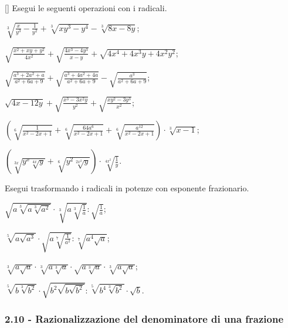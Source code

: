 \begin{esercizio}
 \label{ese:2.66}[\Ast]
Esegui le seguenti operazioni con i radicali.
 \begin{enumeratea}
 \item $\sqrt[3]{\frac x{y^3}-\frac 1{y^2}}+\sqrt[3]{xy^3-y^4}-\sqrt[3]{8x-8y}$;
 \item $\sqrt{\frac{x^2+xy+y^2}{4x^2}}+\sqrt{\frac{4x^3-4y^3}{x-y}}+\sqrt{4x^4+4x^3y+4x^2y^2}$;
 \item $\sqrt{\frac{a^3+2a^2+a}{a^2+6a+9}}+\sqrt{\frac{a^3+4a^2+4a}{a^2+6a+9}}-\sqrt{\frac{a^3}{a^2+6a+9}}$;
 \item $\sqrt{4x-12y}+\sqrt{\frac{x^3-3x^2y}{y^2}}+\sqrt{\frac{xy^2-3y^3}{x^2}}$;
 \item $\left(\sqrt[6]{\frac 1{x^2-2x+1}}+\sqrt[6]{\frac{64a^6}{x^2-2x+1}}+\sqrt[6]{\frac{a^{12}}{x^2-2x+1}}\right)\cdot \sqrt[3]{x-1}$;
 \item $\left(\sqrt[3x]{y^x\sqrt[4x]y}+\sqrt[6]{y^2\sqrt[2x^2]y}\right)\cdot \sqrt[4x^2]{\frac 1 y}$.
 \end{enumeratea}
\end{esercizio}

\begin{esercizio}[\Ast]
 \label{ese:2.67}
Esegui trasformando i radicali in potenze con esponente frazionario.
 \begin{multicols}{2}
 \begin{enumeratea}
 \item $\sqrt{a\sqrt[3]{a\sqrt[3]{a^2}}}\cdot \sqrt[3]{a\sqrt[3]{\frac 1 a}}:\sqrt{\frac 1 a}$;
 \item $\sqrt[5]{a\sqrt{a^3}}\cdot \sqrt{a\sqrt[7]{\frac 1{a^2}}}:\sqrt[7]{a^4\sqrt a}$;
 \item $\sqrt[3]{a\sqrt a}\cdot \sqrt[3]{a\sqrt[3]a}\cdot \sqrt{a\sqrt[3]a}\cdot \sqrt[3]{a\sqrt a}$;
 \item $\sqrt[5]{b\sqrt[3]{b^2}}\cdot \sqrt{b^2\sqrt{b\sqrt{b^2}}}:\sqrt[5]{b^4\sqrt[3]{b^2}}\cdot \sqrt b$.
 \end{enumeratea}
 \end{multicols}
\end{esercizio}

\subsubsection*{2.10 - Razionalizzazione del denominatore di una frazione}

